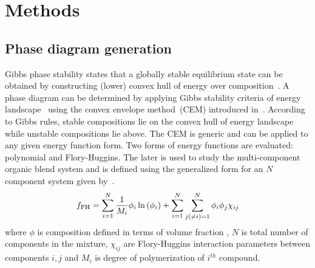 \section{Methods}
\subsection{Phase diagram generation}\label{sec:cem}
Gibbs phase stability states that a globally stable equilibrium state can be obtained by constructing (lower) convex hull of energy over composition~\cite{OryllCEM,SoftMatterCEM}. 
A phase diagram can be determined by applying Gibbs stability criteria of energy landscape~\cite{GibbsCriteria1} using the convex envelope method~(CEM) introduced in~\cite{OryllCEM,SoftMatterCEM}.
According to Gibbs rules, stable compositions lie on the convex hull of energy landscape while unstable compositions lie above.
The CEM is generic and can be applied to any given energy function form. 
Two forms of energy functions are evaluated: polynomial and Flory-Huggins.
The later is used to study the multi-component organic blend system and is defined using the generalized form for an \(N\) component system given by~. 
\begin{equation}\label{eq:FH}
    f_{\text{FH}} = \sum_{i=1}^{N}  \frac{1}{M_i} \phi_{i}\ln\left(\phi_i\right) + \sum_{i=1}^{N}\sum_{j(\neq i)=1}^{N}\phi_i \phi_j \chi_{ij}
\end{equation}
where \(\phi\) is composition defined in terms of volume fraction , \(N\) is total number of components in the mixture, \(\chi_{ij}\) are Flory-Huggins interaction parameters between components \(i,j\) and \(M_i\) is degree of polymerization of \(i^{th}\) compound. 

